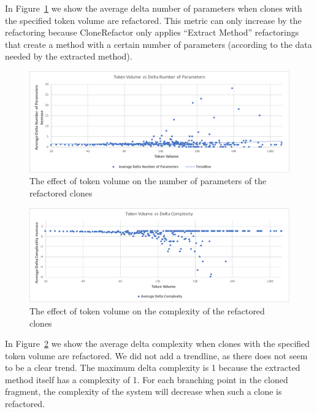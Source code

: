 In Figure~\ref{fig:numberofparameters} we show the average delta number of parameters when clones with the specified token volume are refactored. This metric can only increase by the refactoring because CloneRefactor only applies ``Extract Method'' refactorings that create a method with a certain number of parameters (according to the data needed by the extracted method).

\begin{figure}[]
  \includegraphics[width=1\textwidth]{img/numberofparameters}
  \caption{The effect of token volume on the number of parameters of the refactored clones}
  \label{fig:numberofparameters}
\end{figure}

\begin{figure}[]
  \includegraphics[width=1\textwidth]{img/complexity}
  \caption{The effect of token volume on the complexity of the refactored clones}
  \label{fig:complexity}
\end{figure}

In Figure~\ref{fig:complexity} we show the average delta complexity when clones with the specified token volume are refactored. We did not add a trendline, as there does not seem to be a clear trend. The maximum delta complexity is 1 because the extracted method itself has a complexity of 1. For each branching point in the cloned fragment, the complexity of the system will decrease when such a clone is refactored.

